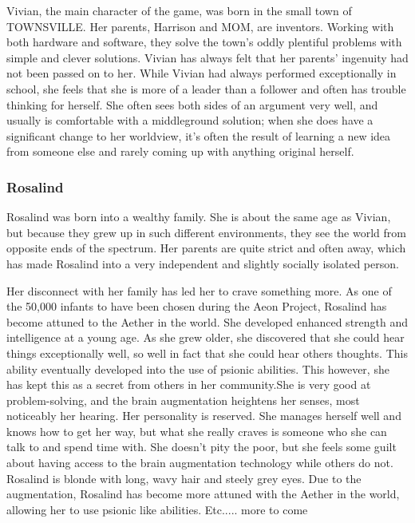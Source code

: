 \documentclass[12pt,titlepage]{article}
\newcommand\dad{Harrison\xspace}
\newcommand\mom{MOM\xspace}
\newcommand\hometown{TOWNSVILLE\xspace}
\begin{document}
Vivian, the main character of the game, was born in the small town of \hometown.
Her parents, \dad and \mom, are inventors. Working with both hardware and
software, they solve the town's oddly plentiful problems with simple and clever
solutions. Vivian has always felt that her parents' ingenuity had not been
passed on to her. While Vivian had always performed exceptionally in school, she
feels that she is more of a leader than a follower and often has trouble
thinking for herself. She often sees both sides of an argument very well, and
usually is comfortable with a middleground solution; when she does have a
significant change to her worldview, it's often the result of learning a new
idea from someone else and rarely coming up with anything original herself.


\subsubsection{Rosalind}
Rosalind was born into a wealthy family. She is about the same age as Vivian,
but because they grew up in such different environments, they see the world from
opposite ends of the spectrum. Her parents are quite strict and often away,
which  has made Rosalind into a very independent and slightly socially isolated
person.

Her disconnect with her family has led her to crave something more. As one of
the 50,000 infants to have been chosen during the Aeon Project, Rosalind has
become attuned to the Aether in the world. She developed enhanced strength and
intelligence at a young age. As she grew older, she discovered that she could
hear things exceptionally well, so well in fact that she could hear others
thoughts. This ability eventually developed into the use of psionic abilities.
This however, she has  kept this as a secret from others in her community.She is
very good at problem-solving, and the brain augmentation heightens her senses,
most noticeably her hearing. Her personality is reserved. She manages herself
well and knows how to get her way, but what she really craves is someone who she
can talk to and spend time with. She doesn't pity the poor, but she feels some
guilt about having access to the brain augmentation technology while others do
not. Rosalind is blonde with long, wavy hair and steely grey eyes.  Due to the
augmentation, Rosalind has become more attuned with the Aether in the world,
allowing her to use psionic like abilities. Etc..... more to come
\end{document}
